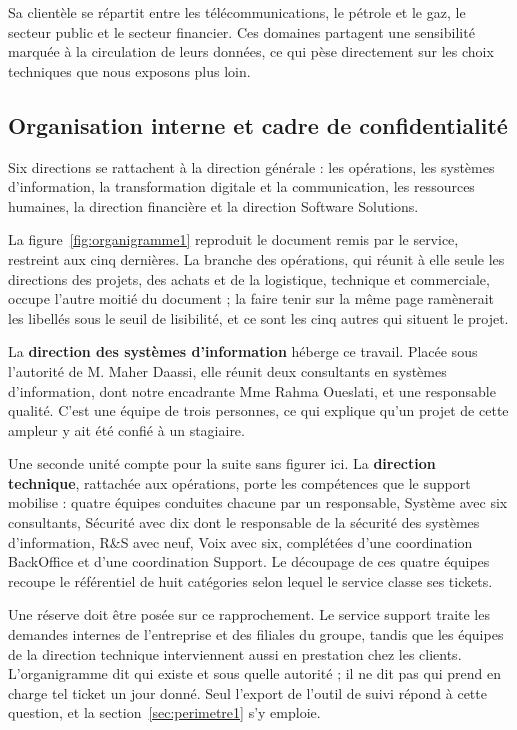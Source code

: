 Sa clientèle se répartit entre les télécommunications, le pétrole et le gaz, le secteur public et le
secteur financier. Ces domaines partagent une sensibilité marquée à la circulation de leurs données,
ce qui pèse directement sur les choix techniques que nous exposons plus loin.

\subsection{Organisation interne et cadre de confidentialité}

\label{sec:organigramme1}

Six directions se rattachent à la direction générale : les opérations, les systèmes d'information,
la transformation digitale et la communication, les ressources humaines, la direction financière et
la direction Software Solutions.

La figure~\ref{fig:organigramme1} reproduit le document remis par le service, restreint aux cinq
dernières. La branche des opérations, qui réunit à elle seule les directions des projets, des achats
et de la logistique, technique et commerciale, occupe l'autre moitié du document ; la faire tenir
sur la même page ramènerait les libellés sous le seuil de lisibilité, et ce sont les cinq autres qui
situent le projet.

La \textbf{direction des systèmes d'information} héberge ce travail. Placée sous l'autorité de
M. Maher Daassi, elle réunit deux consultants en systèmes d'information, dont notre encadrante
Mme Rahma Oueslati, et une responsable qualité. C'est une équipe de trois personnes, ce qui explique
qu'un projet de cette ampleur y ait été confié à un stagiaire.

Une seconde unité compte pour la suite sans figurer ici. La \textbf{direction technique}, rattachée
aux opérations, porte les compétences que le support mobilise : quatre équipes conduites chacune par
un responsable, Système avec six consultants, Sécurité avec dix dont le responsable de la sécurité
des systèmes d'information, R\&S avec neuf, Voix avec six, complétées d'une coordination BackOffice
et d'une coordination Support. Le découpage de ces quatre équipes recoupe le référentiel de huit
catégories selon lequel le service classe ses tickets.

Une réserve doit être posée sur ce rapprochement. Le service support traite les demandes internes de
l'entreprise et des filiales du groupe, tandis que les équipes de la direction technique
interviennent aussi en prestation chez les clients. L'organigramme dit qui existe et sous quelle
autorité ; il ne dit pas qui prend en charge tel ticket un jour donné. Seul l'export de l'outil de
suivi répond à cette question, et la section~\ref{sec:perimetre1} s'y emploie.

